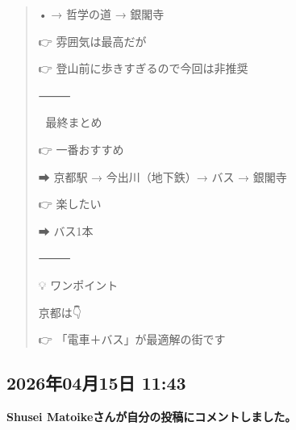 \begin{quote}
• → 哲学の道 → 銀閣寺

👉 雰囲気は最高だが

👉 登山前に歩きすぎるので今回は非推奨

⸻

🎯 最終まとめ

👉 一番おすすめ

➡ 京都駅 → 今出川（地下鉄）→ バス → 銀閣寺

👉 楽したい

➡ バス1本

⸻

💡 ワンポイント

京都は👇

👉 「電車＋バス」が最適解の街です
\end{quote}

\subsection*{2026年04月15日 11:43}

\textbf{Shusei Matoikeさんが自分の投稿にコメントしました。}

